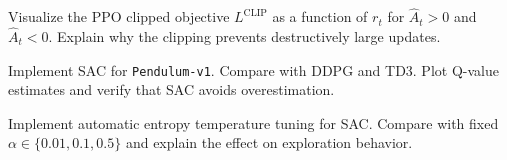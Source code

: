 \begin{exercise}
Visualize the PPO clipped objective $L^{\text{CLIP}}$ as a function of
$r_t$ for $\hat{A}_t > 0$ and $\hat{A}_t < 0$. Explain why the clipping
prevents destructively large updates.
\end{exercise}

\begin{exercise}
Implement SAC for \texttt{Pendulum-v1}. Compare with DDPG and TD3.
Plot Q-value estimates and verify that SAC avoids overestimation.
\end{exercise}

\begin{exercise}
Implement automatic entropy temperature tuning for SAC. Compare with
fixed $\alpha \in \{0.01, 0.1, 0.5\}$ and explain the effect on
exploration behavior.
\end{exercise}
